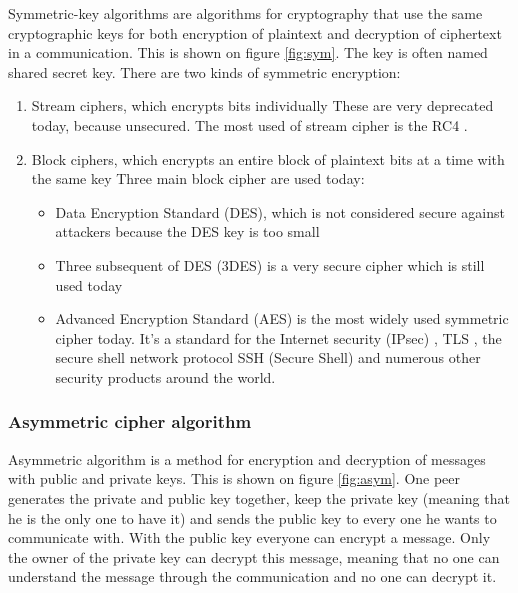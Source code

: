 Symmetric-key algorithms are algorithms for cryptography that use the same
cryptographic keys for both encryption of plaintext and decryption of
ciphertext in a communication. This is shown on figure \ref{fig:sym}.
The key is often named shared secret key.
There are two kinds of symmetric encryption:
\begin{enumerate}[noitemsep]
  \item Stream ciphers, which encrypts bits individually\newline
  These are very deprecated today, because unsecured. The most used of stream
  cipher is the RC4 \cite{RFC7465}.
  \item Block ciphers, which encrypts an entire block of plaintext bits
  at a time with the same key\newline
  Three main block cipher are used today:
  \begin{itemize}
    \item Data Encryption Standard (DES), which is not considered secure against
    attackers because the DES key is too small \cite{RFC4772}
    \item Three subsequent of DES (3DES) is a very secure cipher which is still
    used today
    \item Advanced Encryption Standard (AES) is the most widely used symmetric
    cipher today. It's a standard for the Internet security
    (IPsec) \cite{RFC3602}, TLS \cite{RFC5246}, the secure shell network
    protocol SSH (Secure Shell) \cite{RFC5647} and numerous other security
    products around the world.
  \end{itemize}
\end{enumerate}

\subsubsection{Asymmetric cipher algorithm}
\label{intro_asym_cipher}

Asymmetric algorithm is a method for encryption and decryption of messages with
public and private keys. This is shown on figure \ref{fig:asym}.
One peer generates the private and public key together, keep the private key
(meaning that he is the only one to have it) and sends the public key to every
one he wants to communicate with.
With the public key everyone can encrypt a message. Only the owner of the
private key can decrypt this message, meaning that no one can understand the
message through the communication and no one can decrypt it.

